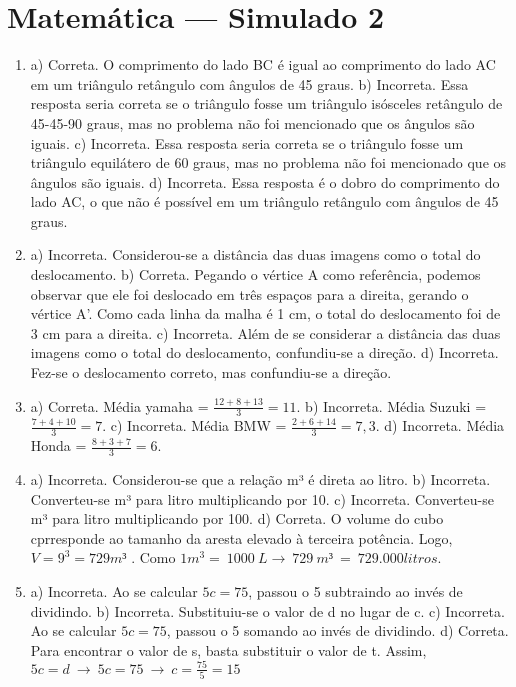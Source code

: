 \section*{Matemática — Simulado 2}

\begin{enumerate}
\item a) Correta. O comprimento do lado BC é igual ao comprimento do lado AC em um triângulo retângulo com ângulos de 45 graus.
b) Incorreta. Essa resposta seria correta se o triângulo fosse um triângulo isósceles retângulo de 45-45-90 graus, mas no problema não foi mencionado que os ângulos são iguais.
c) Incorreta. Essa resposta seria correta se o triângulo fosse um triângulo equilátero de 60 graus, mas no problema não foi mencionado que os ângulos são iguais.
d) Incorreta. Essa resposta é o dobro do comprimento do lado AC, o que não é possível em um triângulo retângulo com ângulos de 45 graus.


\item a) Incorreta. Considerou-se a distância das duas imagens como o total do deslocamento.
b) Correta. Pegando o vértice A como referência, podemos observar que ele foi deslocado em três espaços para a direita, gerando o vértice
A'. Como cada linha da malha é 1 cm, o total do deslocamento foi de 3 cm para a direita.
c) Incorreta. Além de se considerar a distância das duas imagens como o total do deslocamento, confundiu-se a direção.
d) Incorreta. Fez-se o deslocamento correto, mas confundiu-se a direção.

\item a) Correta.
Média yamaha =  $\frac{12 + 8 + 13}{3} = 11$.
b) Incorreta.
Média Suzuki  =  $\frac{7 + 4 + 10}{3} = 7$.
c) Incorreta.
Média BMW =  $\frac{2 + 6 + 14}{3} = 7,3$.
d) Incorreta.
Média Honda = $\frac{8 + 3 + 7}{3} = 6$.


\item a) Incorreta. Considerou-se que a relação m³ é direta ao litro.
b) Incorreta. Converteu-se m³ para litro multiplicando por 10.
c) Incorreta. Converteu-se m³ para litro multiplicando por 100.
d) Correta. O volume do cubo cprresponde ao tamanho da aresta elevado à terceira potência. Logo, $V = 9^{3} = 729m³$ . Como
$1m^{3} = \ 1000\ L \rightarrow \ 729\ m³\  = \ 729.000 litros$.


\item a) Incorreta. Ao se calcular $5c = 75$, passou o 5 subtraindo ao invés de dividindo.
b) Incorreta. Substituiu-se o valor de d no lugar de c.
c) Incorreta. Ao se calcular $5c = 75$, passou o 5 somando ao invés de dividindo.
d) Correta. Para encontrar o valor de s, basta substituir o valor de t. Assim, $5c = d\  \rightarrow \ 5c = 75\  \rightarrow \ c = \frac{75}{5} = 15$
\end{enumerate}

